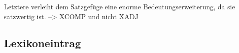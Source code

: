 \documentclass[12pt,a4paper]{article}
\begin{document}
Letztere verleiht dem Satzgefüge eine enorme Bedeutungserweiterung, da sie satzwertig ist. --> XCOMP und nicht XADJ


	

\subsection{Lexikoneintrag}
\end{document}
